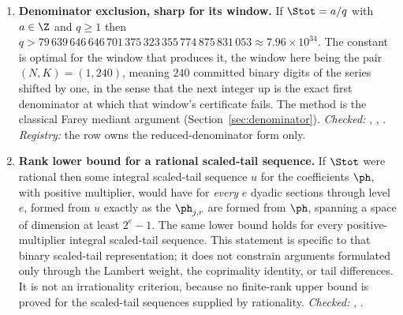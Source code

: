 {\begin{enumerate}[label=\textbf{R\arabic*.},ref=R\arabic*,leftmargin=2.4em,
  itemsep=0.2em,topsep=0.25em]
\item\label{res:denominator} 
\textbf{Denominator exclusion, sharp for its window.}  If $\Stot=a/q$ with
$a\in\Z$ and $q\ge1$ then
$q>79\,639\,646\,646\,701\,375\,323\,355\,774\,875\,831\,053\approx7.96\times10^{34}$.
The constant is optimal for the window that produces it, the window here being
the pair $(N,K)=(1,240)$, meaning $240$ committed binary digits of the series
shifted by one, in the sense that the next integer up is the exact first
denominator at which that window's certificate fails.  The method is the
classical Farey mediant argument (Section~\ref{sec:denominator}).
{\footnotesize\emph{Checked:}
,
,
.
\emph{Registry:} the row owns the reduced-denominator form only.}

\item\label{res:carryrank} 
\textbf{Rank lower bound for a rational scaled-tail sequence.}  If $\Stot$
were rational then some integral scaled-tail sequence $u$ for the coefficients
$\ph$, with positive multiplier, would have for \emph{every} $e$ dyadic
sections through level $e$, formed from $u$ exactly as the $\ph_{j,r}$ are
formed from $\ph$, spanning a space of dimension at least $2^e-1$.  The
same lower bound holds for every positive-multiplier integral scaled-tail
sequence.  This statement is specific to that
binary scaled-tail representation; it does not constrain arguments formulated
only through the Lambert weight, the coprimality identity, or tail differences.
It is not an irrationality criterion, because no finite-rank upper bound is
proved for the scaled-tail sequences supplied by rationality.
{\footnotesize\emph{Checked:}
,
.}


\end{enumerate}}
